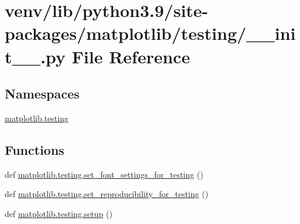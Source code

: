 \hypertarget{venv_2lib_2python3_89_2site-packages_2matplotlib_2testing_2____init_____8py}{}\section{venv/lib/python3.9/site-\/packages/matplotlib/testing/\+\_\+\+\_\+init\+\_\+\+\_\+.py File Reference}
\label{venv_2lib_2python3_89_2site-packages_2matplotlib_2testing_2____init_____8py}
\subsection*{Namespaces}
\begin{DoxyCompactItemize}
\item 
 \hyperlink{namespacematplotlib_1_1testing}{matplotlib.\+testing}
\end{DoxyCompactItemize}
\subsection*{Functions}
\begin{DoxyCompactItemize}
\item 
def \hyperlink{namespacematplotlib_1_1testing_a1f00437dcffc55d0cd1f90d1aa145c0d}{matplotlib.\+testing.\+set\+\_\+font\+\_\+settings\+\_\+for\+\_\+testing} ()
\item 
def \hyperlink{namespacematplotlib_1_1testing_a52faea5be4a2f14a557b8adb5b7f3294}{matplotlib.\+testing.\+set\+\_\+reproducibility\+\_\+for\+\_\+testing} ()
\item 
def \hyperlink{namespacematplotlib_1_1testing_a982fab1af51b1415bd9a633d60ac92d0}{matplotlib.\+testing.\+setup} ()
\end{DoxyCompactItemize}
